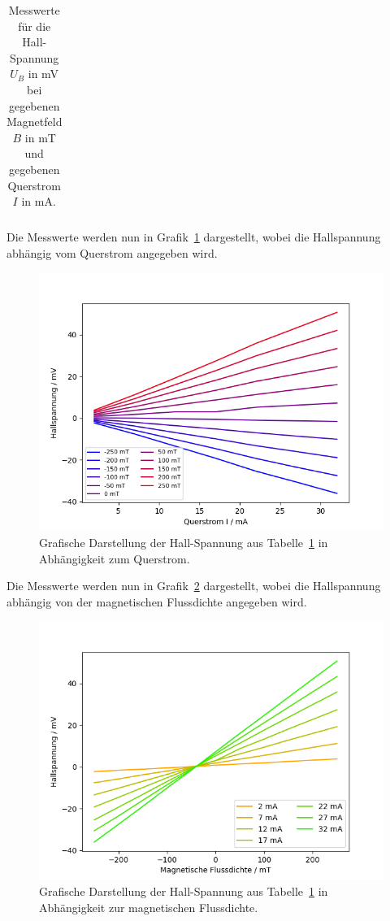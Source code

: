 \documentclass{article}
\begin{document}
\begin{table}[H]
\caption{Messwerte für die Hall-Spannung $U_B$ in mV bei gegebenen Magnetfeld $B$ in mT und gegebenen Querstrom $I$ in mA.}
\begin{tabular}{c|ccccccccccc}

\end{tabular}
\label{tab:messung}
\end{table}

Die Messwerte werden nun in Grafik~\ref{fig:messung1} dargestellt, wobei die Hallspannung abhängig vom Querstrom angegeben wird.
\begin{figure}[H]
\includegraphics[scale=0.7]{regression_I.png}
\caption{Grafische Darstellung der Hall-Spannung aus Tabelle~\ref{tab:messung} in Abhängigkeit zum Querstrom.}
\label{fig:messung1}
\end{figure}



Die Messwerte werden nun in Grafik~\ref{fig:messung2} dargestellt, wobei die Hallspannung abhängig von der magnetischen Flussdichte angegeben wird.
\begin{figure}[H]
\includegraphics[scale=0.7]{regression_B.png}
\caption{Grafische Darstellung der Hall-Spannung aus Tabelle~\ref{tab:messung} in Abhängigkeit zur magnetischen Flussdichte.}
\label{fig:messung2}
\end{figure}
\end{document}
